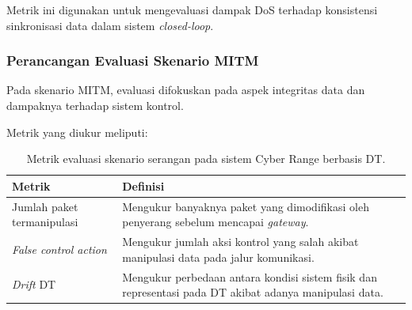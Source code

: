 Metrik ini digunakan untuk mengevaluasi dampak DoS terhadap konsistensi sinkronisasi data dalam sistem \textit{closed-loop}.

\subsubsection{Perancangan Evaluasi Skenario MITM}
Pada skenario MITM, evaluasi difokuskan pada aspek integritas data dan dampaknya terhadap sistem kontrol.

Metrik yang diukur meliputi:
\renewcommand{\arraystretch}{1.3}
\begin{table}[htbp]
    \centering
    \caption{Metrik evaluasi skenario serangan pada sistem Cyber Range berbasis DT.}
    \label{tab:metrik_serangan}
    \begin{tabular}{|l|p{9cm}|}
        \hline
        \textbf{Metrik} & \textbf{Definisi} \\
        \hline
        Jumlah paket termanipulasi & Mengukur banyaknya paket yang dimodifikasi oleh penyerang sebelum mencapai \textit{gateway}. \\
        \hline
        \textit{False control action} & Mengukur jumlah aksi kontrol yang salah akibat manipulasi data pada jalur komunikasi. \\
        \hline
        \textit{Drift} DT & Mengukur perbedaan antara kondisi sistem fisik dan representasi pada DT akibat adanya manipulasi data. \\
        \hline
    \end{tabular}
\end{table}
